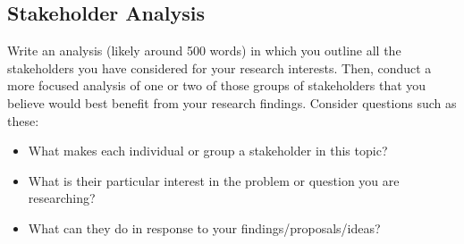 \documentclass[10pt,oneside]{amsart}	%
\begin{document}
\begin{comment}
	In brief, you need to accomplish these tasks before you can write the report:
	\begin{enumerate}
		\item Brainstorm some of the people who might be the most interested in your research question or problem. Choose one or two of these groups of stakeholders to focus on as a possible audience for your final project. (In short, who cares about your opinions? Whom do you need to persuade?)
		\item Determine the “genre sets” used by that group of stakeholders. (How do those people communicate? What persuades them?)
		\item Analyze the characteristics of one genre used by your stakeholder. Determine what you need to know to be able to competently write in it for your final project. (Create a genre memo in a group of your peers who chose the same genre.)
		\item Conduct original research to add to the current knowledge on the topic.
		\item Analyze the data you collect and present it meaningfully to an audience with little familiarity with your topic (i.e. your peers).
	\end{enumerate}
\end{comment}

\subsection{Stakeholder Analysis} %
\label{sub:stakeholder_analysis}
Write an analysis (likely around 500 words) in which you outline all the stakeholders you have considered for your research interests. Then, conduct a more focused analysis of one or two of those groups of stakeholders that you believe would best benefit from your research findings. Consider questions such as these:
	\begin{itemize}
		\item What makes each individual or group a stakeholder in this topic?
		\item  What is their particular interest in the problem or question you are researching?
		\item  What can they do in response to your findings/proposals/ideas?
	\end{itemize}
\end{document}
